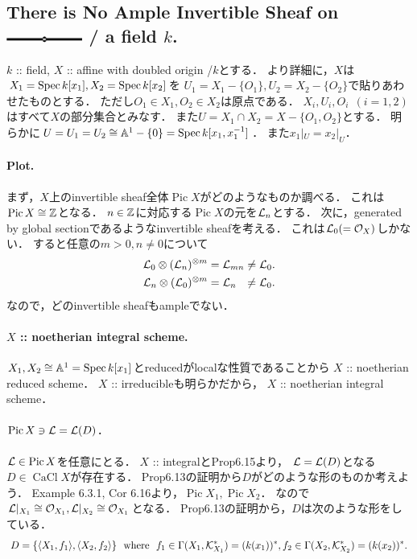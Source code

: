 \documentclass[a4paper]{jsarticle}
\newcommand{\CaCl}{\operatorname{CaCl}}
\newcommand{\Pic}{\operatorname{Pic}}
\begin{document}
    \subsection{There is No Ample Invertible Sheaf on 
        \protect\includegraphics[width=2.5cm]{./images/affine_with_doubled_origin2.eps} / a field $k$.}
    $k$ :: field,
    $X$ :: affine with doubled origin /$k$とする．
    より詳細に，$X$は$X_1=\operatorname{Spec} k[x_1], X_2=\operatorname{Spec} k[x_2]$を
    $U_1=X_1-\{O_1\}, U_2=X_2-\{O_2\}$で貼りあわせたものとする．
    ただし$O_1 \in X_1,O_2 \in X_2$は原点である．
    $X_i, U_i, O_i ~~(i=1,2)$はすべて$X$の部分集合とみなす．
    また$U=X_1 \cap X_2=X-\{O_1, O_2\}$とする．
    明らかに$U=U_1=U_2 \cong \mathbb{A}^1-\{0\}=\operatorname{Spec} k[x_1, x_1^{-1}]$．
    また$x_1|_U=x_2|_U$．

    \paragraph{Plot.}
    まず，$X$上のinvertible sheaf全体$\Pic X$がどのようなものか調べる．
    これは$\Pic X \iso \Z$となる．
    $n \in \mathbb{Z}$に対応する$\Pic X$の元を$\mathcal{L}_n$とする．
    次に，generated by global sectionであるようなinvertible sheafを考える．
    これは$\mathcal{L}_0(=\mathcal{O}_X)$しかない．
    すると任意の$m>0, n \neq 0$について
    \begin{align*}
        \mathcal{L}_0 \otimes (\mathcal{L}_n)^{\otimes m} &= \mathcal{L}_{mn} \neq \mathcal{L}_0. \\
        \mathcal{L}_n \otimes (\mathcal{L}_0)^{\otimes m} &= \mathcal{L}_n \hspace{7pt}\neq \mathcal{L}_0.
    \end{align*}
    なので，どのinvertible sheafもampleでない．

    \paragraph{$X$ :: noetherian integral scheme.}
    $X_1, X_2 \cong \mathbb{A}^1=\operatorname{Spec} k[x_1]$とreducedがlocalな性質であることから
    $X$ :: noetherian reduced scheme．
    $X$ :: irreducibleも明らかだから，
    $X$ :: noetherian integral scheme．

    \paragraph{$\Pic X \ni \shL=\shL(D)$.}
    $\shL \in \Pic X$を任意にとる．
    $X$ :: integralとProp6.15より，
    $\mathcal{L}=\mathcal{L}(D)$となる$D \in \CaCl X$が存在する．
    Prop6.13の証明から$D$がどのような形のものか考えよう．
    Example 6.3.1, Cor 6.16より，$\Pic X_1, \Pic X_2$．
    なので$\mathcal{L}|_{X_1} \cong \mathcal{O}_{X_1}, \mathcal{L}|_{X_2} \cong \mathcal{O}_{X_1}$となる．
    Prop6.13の証明から，$D$は次のような形をしている．
    \[
        D=\{ \langle X_1,f_1 \rangle, \langle X_2,f_2 \rangle \}
        ~~\text{where}~~
        f_1 \in \Gamma(X_1, \mathcal{K}_{X_1}^*)=(k(x_1))^*,
        f_2 \in \Gamma(X_2, \mathcal{K}_{X_2}^*)=(k(x_2))^*.
    \]
\end{document}
